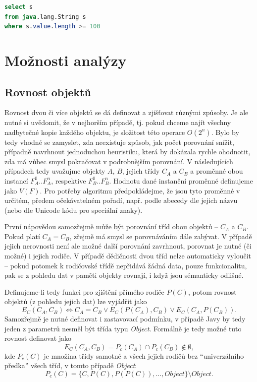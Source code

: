 \begin{lstlisting}[caption={Příklad OQL}, label={oql}, frame={single}, language={SQL}]
select s 
from java.lang.String s 
where s.value.length >= 100
\end{lstlisting}






\chapter{Možnosti analýzy}

\section{Rovnost objektů}
Rovnost dvou či více objektů se dá definovat a zjišťovat různými způsoby. Je ale nutné si uvědomit, že v nejhorším případě, tj. pokud chceme najít všechny nadbytečné kopie každého objektu, je složitost této operace $O(2^n)$. Bylo by tedy vhodné se zamyslet, zda neexistuje způsob, jak počet porovnání snížit, případně navrhnout jednoduchou heuristiku, která by dokázala rychle ohodnotit, zda má vůbec smysl pokračovat v podrobnějším porovnání. V následujících případech tedy uvažujme objekty $A$, $B$, jejich třídy $C_A$ a $C_B$ a proměnné obou instancí $F_A^0..F_A^n$, respektive $F_B^0..F_B^n$. Hodnotu dané instanční proměnné definujeme jako $V(F)$. Pro potřeby algoritmu předpokládejme, že jsou tyto proměnné v určitém, předem očekávatelném pořadí, např. podle abecedy dle jejich názvu (nebo dle Unicode kódu pro speciální znaky).

První nápovědou samozřejmě může být porovnání tříd obou objektů -- $C_A$ a $C_B$. Pokud platí $C_A = C_B$, zřejmě má smysl se porovnáváním dále zabývat. V případě jejich nerovnosti není ale možné další porovnání zavrhnout, porovnat je nutné (či možné) i jejich rodiče. V případě dědičnosti dvou tříd nelze automaticky vyloučit -- pokud potomek k rodičovské třídě nepřidává žádná data, pouze funkcionalitu, pak se z pohledu dat v paměti objekty rovnají, i když jsou sémanticky odlišné.

Definujeme-li tedy funkci pro zjištění přímého rodiče $P(C)$, potom rovnost objektů (z pohledu jejich dat) lze vyjádřit jako
    $$ E_C(C_A, C_B) \Leftrightarrow C_A = C_B \vee E_C(P(C_A), C_B) \vee E_C(C_A, P(C_B)).$$    
Samozřejmě je nutné definovat i zastavovací podmínku, v případě Javy by tedy jeden z parametrů nesměl být třída typu \textit{Object}. Formálně je tedy možné tuto rovnost definovat jako
	$$ E_C(C_A, C_B) = P_c(C_A) \cap P_c(C_B) \notin \emptyset,$$
kde $P_c(C)$ je množina třídy samotné a všech jejich rodičů bez “univerzálního předka” všech tříd, v tomto případě \textit{Object}:
	$$ P_c(C) = \{C, P(C), P(P(C)), \dots, Object\} \setminus Object. $$

